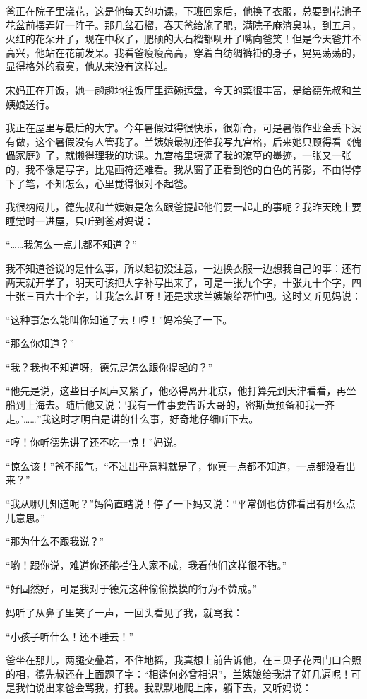\par 爸正在院子里浇花，这是他每天的功课，下班回家后，他换了衣服，总要到花池子花盆前摆弄好一阵子。那几盆石榴，春天爸给施了肥，满院子麻渣臭味，到五月，火红的花朵开了，现在中秋了，肥硕的大石榴都咧开了嘴向爸笑！但是今天爸并不高兴，他站在花前发呆。我看爸瘦瘦高高，穿着白纺绸裤褂的身子，晃晃荡荡的，显得格外的寂寞，他从来没有这样过。
\par 宋妈正在开饭，她一趟趟地往饭厅里运碗运盘，今天的菜很丰富，是给德先叔和兰姨娘送行。
\par 我正在屋里写最后的大字。今年暑假过得很快乐，很新奇，可是暑假作业全丢下没有做，这个暑假没有人管我了。兰姨娘最初还催我写九宫格，后来她只顾得看《傀儡家庭》了，就懒得理我的功课。九宫格里填满了我的潦草的墨迹，一张又一张的，我不像是写字，比鬼画符还难看。我从窗子正看到爸的白色的背影，不由得停下了笔，不知怎么，心里觉得很对不起爸。
\par 我很纳闷儿，德先叔和兰姨娘是怎么跟爸提起他们要一起走的事呢？我昨天晚上要睡觉时一进屋，只听到爸对妈说：
\par “……我怎么一点儿都不知道？”
\par 我不知道爸说的是什么事，所以起初没注意，一边换衣服一边想我自己的事：还有两天就开学了，明天可该把大字补写出来了，可是一张九个字，十张九十个字，四十张三百六十个字，让我怎么赶呀！还是求求兰姨娘给帮忙吧。这时又听见妈说：
\par “这种事怎么能叫你知道了去！哼！”妈冷笑了一下。
\par “那么你知道？”
\par “我？我也不知道呀，德先是怎么跟你提起的？”
\par “他先是说，这些日子风声又紧了，他必得离开北京，他打算先到天津看看，再坐船到上海去。随后他又说：‘我有一件事要告诉大哥的，密斯黄预备和我一齐走。'……”我这时才明白是讲的什么事，好奇地仔细听下去。
\par “哼！你听德先讲了还不吃一惊！”妈说。
\par “惊么该！”爸不服气，“不过出乎意料就是了，你真一点都不知道，一点都没看出来？”
\par “我从哪儿知道呢？”妈简直瞎说！停了一下妈又说：“平常倒也仿佛看出有那么点儿意思。”
\par “那为什么不跟我说？”
\par “哟！跟你说，难道你还能拦住人家不成，我看他们这样很不错。”
\par “好固然好，可是我对于德先这种偷偷摸摸的行为不赞成。”
\par 妈听了从鼻子里笑了一声，一回头看见了我，就骂我：
\par “小孩子听什么！还不睡去！”
\par 爸坐在那儿，两腿交叠着，不住地摇，我真想上前告诉他，在三贝子花园门口合照的相，德先叔还在上面题了字：“相逢何必曾相识”，兰姨娘给我讲了好几遍呢！可是我怕说出来爸会骂我，打我。我默默地爬上床，躺下去，又听妈说：
